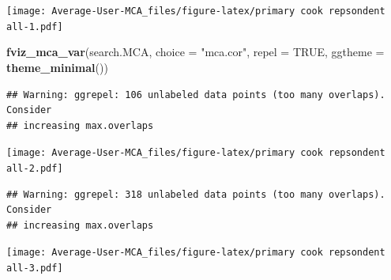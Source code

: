 \documentclass[
]{article}
\newenvironment{Shaded}{\begin{snugshade}}{\end{snugshade}}
\newcommand{\DataTypeTok}[1]{\textcolor[rgb]{0.13,0.29,0.53}{#1}}
\newcommand{\KeywordTok}[1]{\textcolor[rgb]{0.13,0.29,0.53}{\textbf{#1}}}
\newcommand{\NormalTok}[1]{#1}
\newcommand{\OperatorTok}[1]{\textcolor[rgb]{0.81,0.36,0.00}{\textbf{#1}}}
\newcommand{\OtherTok}[1]{\textcolor[rgb]{0.56,0.35,0.01}{#1}}
\newcommand{\StringTok}[1]{\textcolor[rgb]{0.31,0.60,0.02}{#1}}
\begin{document}
\texttt{[image: Average-User-MCA\_files/figure-latex/primary cook repsondent all-1.pdf]}

\begin{Shaded}
\begin{Highlighting}[]
\KeywordTok{fviz_mca_var}\NormalTok{(search.MCA, }\DataTypeTok{choice =} \StringTok{"mca.cor"}\NormalTok{, }\DataTypeTok{repel =} \OtherTok{TRUE}\NormalTok{,}
             \DataTypeTok{ggtheme =} \KeywordTok{theme_minimal}\NormalTok{())}
\end{Highlighting}
\end{Shaded}

\begin{verbatim}
## Warning: ggrepel: 106 unlabeled data points (too many overlaps). Consider
## increasing max.overlaps
\end{verbatim}

\texttt{[image: Average-User-MCA\_files/figure-latex/primary cook repsondent all-2.pdf]}

\begin{Shaded}
\end{Shaded}

\begin{verbatim}
## Warning: ggrepel: 318 unlabeled data points (too many overlaps). Consider
## increasing max.overlaps
\end{verbatim}

\texttt{[image: Average-User-MCA\_files/figure-latex/primary cook repsondent all-3.pdf]}

\begin{Shaded}
\end{Shaded}
\end{document}

